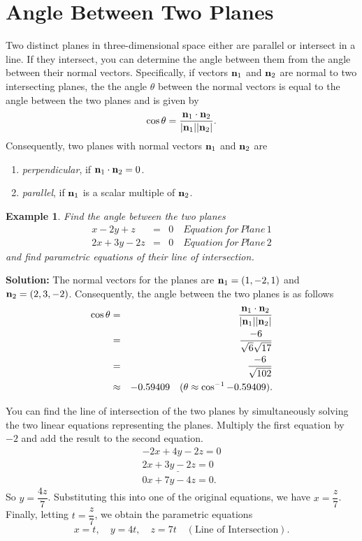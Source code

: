 \documentclass[titlepage,a4paper,12pt]{report}
\newtheorem{example}{Example}[section]
\begin{document}
\section{Angle Between Two Planes}
Two distinct planes in three-dimensional space either are parallel or intersect in a line. If they intersect, you can determine the angle between them from the angle between their normal vectors. Specifically, if vectors ${\bf{n}}_1$ and ${\bf{n}}_2$ are normal to two intersecting planes, the the angle $\theta $ between the normal vectors is equal to the angle between the two planes and is given by 
\[\cos \theta =\dfrac{{\bf{n}}_1 \cdot {\bf{n}}_2}{|{\bf{n}}_1||{\bf{n}}_2|}.\]
Consequently, two planes with normal vectors ${\bf{n}}_1$ and ${\bf{n}}_2$ are 
\begin{enumerate}
\item \textit{perpendicular}, if ${\bf{n}}_1\cdot {\bf{n}}_2 =0$.
\item \textit{parallel}, if ${\bf{n}}_1$ is a scalar multiple of ${\bf{n}}_2$.
\end{enumerate}
\begin{example}
Find the angle between the two planes
\begin{eqnarray*}
x-2y+z &=& 0 \quad Equation\, for\, Plane\, 1\\
2x+3y-2z &=& 0 \quad Equation\, for\, Plane\, 2
\end{eqnarray*} 
and find parametric equations of their line of intersection. 
\end{example}

\noindent \textbf{Solution:} The normal vectors for the planes are ${\bf{n}}_1=(1,-2,1)$ and ${\bf{n}}_2=(2,3,-2)$. Consequently, the angle between the two planes is as follows 
\begin{eqnarray*}
\cos \theta &=& \dfrac{{\bf{n}}_1 \cdot {\bf{n}}_2}{|{\bf{n}}_1||{\bf{n}}_2|} \\
&=& \dfrac{-6}{\sqrt{6}\sqrt{17}} \\
&=& \dfrac{-6}{\sqrt{102}} \\
&\approx & -0.59409 \quad (\theta \approx \cos ^{-1} -0.59409).
\end{eqnarray*} 

\noindent You can find the line of intersection of the two planes by simultaneously solving the two linear equations representing the planes. Multiply the first equation by $-2$ and add the result to the second equation.
\begin{eqnarray*}
-2x +4y-2z = 0\\
\underline{2x+3y-2z = 0} \\
0x +7y-4z=0.
\end{eqnarray*}
So $y=\dfrac{4z}{7}$. Substituting this into one of the original equations, we have $x=\dfrac{z}{7}$. Finally, letting $t=\dfrac{z}{7}$, we obtain the parametric equations 
\[x=t, \quad y=4t, \quad z=7t \quad (\mbox{Line of Intersection} ).\]  
\end{document}
